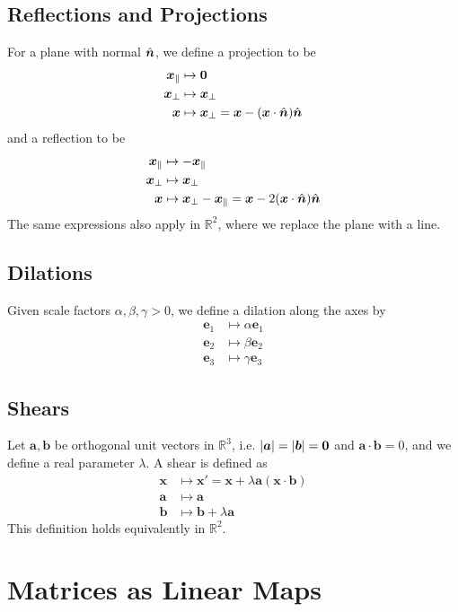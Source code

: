 \documentclass{article}
\begin{document}
	\subsection{Reflections and Projections}
	For a plane with normal $\hat{\bm n}$, we define a projection to be
	\begin{align*}
		\bm x_\parallel &\mapsto \bm 0 \\
		\bm x_\perp &\mapsto \bm x_\perp \\
		\bm x &\mapsto \bm x_\perp = \bm x - (\bm x \cdot \hat{\bm n}) \hat{\bm n}
	\end{align*}
	and a reflection to be
	\begin{align*}
		\bm x_\parallel &\mapsto -\bm x_\parallel \\
		\bm x_\perp &\mapsto \bm x_\perp \\
		\bm x &\mapsto \bm x_\perp - \bm x_\parallel = \bm x - 2(\bm x \cdot \hat{\bm n}) \hat{\bm n}
	\end{align*}
	The same expressions also apply in $\mathbb R^2$, where we replace the plane with a line.

	\subsection{Dilations}
	Given scale factors $\alpha, \beta, \gamma > 0$, we define a dilation along the axes by
	\begin{align*}
		\bm e_1 &\mapsto \alpha \bm e_1 \\
		\bm e_2 &\mapsto \beta \bm e_2 \\
		\bm e_3 &\mapsto \gamma \bm e_3
	\end{align*}

	\subsection{Shears}
	Let $\bm a, \bm b$ be orthogonal unit vectors in $\mathbb R^3$, i.e. $\abs{\bm a} = \abs{\bm b} = \bm 0$ and $\bm a \cdot \bm b = 0$, and we define a real parameter $\lambda$. A shear is defined as
	\begin{align*}
		\bm x &\mapsto \bm x' = \bm x + \lambda \bm a (\bm x \cdot \bm b) \\
		\bm a &\mapsto \bm a \\
		\bm b &\mapsto \bm b + \lambda \bm a
	\end{align*}
	This definition holds equivalently in $\mathbb R^2$.

	\section{Matrices as Linear Maps}
\end{document}
